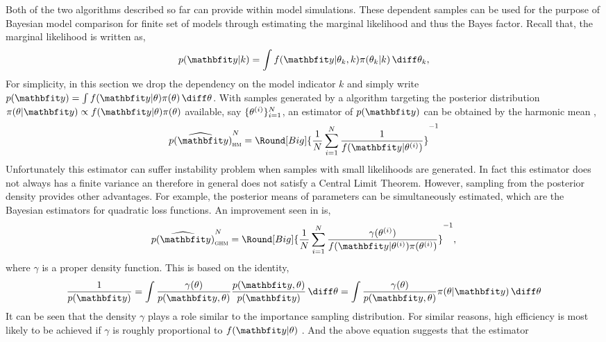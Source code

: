 Both of the two algorithms described so far can provide within model
simulations. These dependent samples can be used for the purpose of Bayesian
model comparison for finite set of models through estimating the marginal
likelihood and thus the Bayes factor. Recall that, the marginal likelihood is
written as,
\begin{equation*}
  p(\data|k) = \int f(\data|\theta_k,k)\pi(\theta_k|k)\intd\theta_k,
\end{equation*}
For simplicity, in this section we drop the dependency on the model indicator
$k$ and simply write $p(\data) = \int f(\data|\theta)\pi(\theta)\intd\theta$.  With
samples generated by a \mcmc algorithm targeting the posterior distribution
$\pi(\theta|\data) \propto f(\data|\theta) \pi(\theta)$ available, say $\{\theta^{(i)}\}_{i=1}^N$,
an estimator of $p(\data)$ can be obtained by the harmonic mean
\parencite{Newton:1994wm},
\begin{equation}
  \widehat{p(\data)}_{\text{\textsc{hm}}}^N =
  \Round[Big]{\frac{1}{N}\sum_{i=1}^N\frac{1}{f(\data|\supi\theta)}}^{-1}
\end{equation}
Unfortunately this estimator can suffer instability problem when samples with
small likelihoods are generated. In fact this estimator does not always has a
finite variance an therefore in general does not satisfy a Central Limit
Theorem. However, sampling from the posterior density provides other
advantages. For example, the posterior means of parameters can be
simultaneously estimated, which are the Bayesian estimators for quadratic loss
functions. An improvement seen in \textcite{Kass:1995vb} is,
\begin{equation}
  \widehat{p(\data)}_{\text{\textsc{ghm}}}^N = \Round[Big]{
    \frac{1}{N}\sum_{i=1}^N
    \frac{\gamma(\supi\theta)}{f(\data|\supi\theta)\pi(\supi\theta)}}^{-1},
\end{equation}
where $\gamma$ is a proper density function. This is based on the identity,
\begin{equation}
  \frac{1}{p(\data)}
  = \int \frac{\gamma(\theta)}{p(\data,\theta)}
  \frac{p(\data,\theta)}{p(\data)} \intd \theta
  = \int \frac{\gamma(\theta)}{p(\data,\theta)} \pi(\theta|\data) \intd \theta
\end{equation}
It can be seen that the density $\gamma$ plays a role similar to the
importance sampling distribution. For similar reasons, high efficiency is most
likely to be achieved if $\gamma$ is roughly proportional to $f(\data|\theta)$
\parencite{Kass:1995vb}. And the above equation suggests that the estimator
